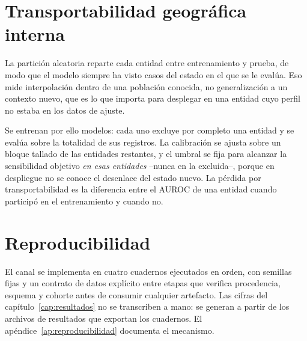 \section{Transportabilidad geográfica interna}
\label{sec:loeo}

La partición aleatoria reparte cada entidad entre entrenamiento y prueba, de modo
que el modelo siempre ha visto casos del estado en el que se le evalúa. Eso mide
interpolación dentro de una población conocida, no generalización a un contexto
nuevo, que es lo que importa para desplegar en una entidad cuyo perfil no estaba
en los datos de ajuste.

Se entrenan por ello \loeoNent{} modelos: cada uno excluye por completo una
entidad y se evalúa sobre la totalidad de sus registros. La calibración se ajusta
sobre un bloque tallado de las entidades restantes, y el umbral se fija para
alcanzar la sensibilidad objetivo \emph{en esas entidades} --nunca en la
excluida--, porque en despliegue no se conoce el desenlace del estado nuevo. La
pérdida por transportabilidad es la diferencia entre el AUROC de una entidad
cuando participó en el entrenamiento y cuando no.


\section{Reproducibilidad}

El canal se implementa en cuatro cuadernos ejecutados en orden, con semillas
fijas y un contrato de datos explícito entre etapas que verifica procedencia,
esquema y cohorte antes de consumir cualquier artefacto. Las cifras del
capítulo~\ref{cap:resultados} no se transcriben a mano: se generan a partir de los
archivos de resultados que exportan los cuadernos. El apéndice~\ref{ap:reproducibilidad}
documenta el mecanismo.
